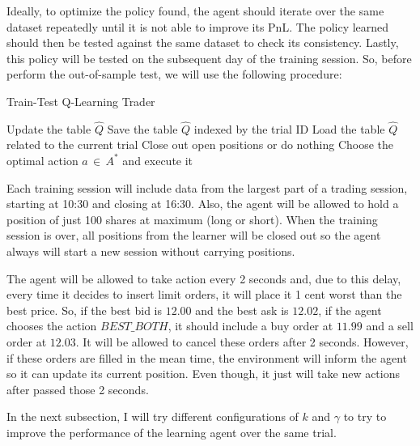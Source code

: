 \documentclass[a4paper]{article}
\begin{document}
Ideally, to optimize the policy found, the agent should iterate over the same dataset repeatedly until it is not able to improve its PnL. The policy learned should then be tested against the same dataset to check its consistency. Lastly, this policy will be tested on the subsequent day of the training session. So, before perform the out-of-sample test, we will use the following procedure:

\begin{algorithm}
\caption{Train-Test Q-Learning Trader}\label{alg:qtrader}
\begin{algorithmic}[1]
    \State Update the table $\hat{Q}$
  \EndLoop
  \State Save the table $\hat{Q}$ indexed by the trial ID
\EndLoop
{}
  \State Load the table $\hat{Q}$ related to the current trial
      	\State Close out open positions or do nothing
      \Else
        \State Choose the optimal action $a \, \in \, A^{*}$ and execute it
      \EndIf
    \EndLoop
  \EndLoop
\EndLoop
\end{algorithmic}
\end{algorithm}

Each training session will include data from the largest part of a trading session, starting at 10:30 and closing at 16:30. Also, the agent will be allowed to hold a position of just 100 shares at maximum (long or short). When the training session is over, all positions from the learner will be closed out so the agent always will start a new session without carrying positions.

The agent will be allowed to take action every 2 seconds and, due to this delay, every time it decides to insert limit orders, it will place it 1 cent worst than the best price. So, if the best bid is $12.00$ and the best ask is $12.02$, if the agent chooses the action $BEST\_BOTH$, it should include a buy order at $11.99$ and a sell order at $12.03$. It will be allowed to cancel these orders after 2 seconds. However, if these orders are filled in the mean time, the environment will inform the agent so it can update its current position. Even though, it just will take new actions after passed those 2 seconds.

In the next subsection, I will try different configurations of $k$ and $\gamma$ to try to improve the performance of the learning agent over the same trial.
\end{document}
